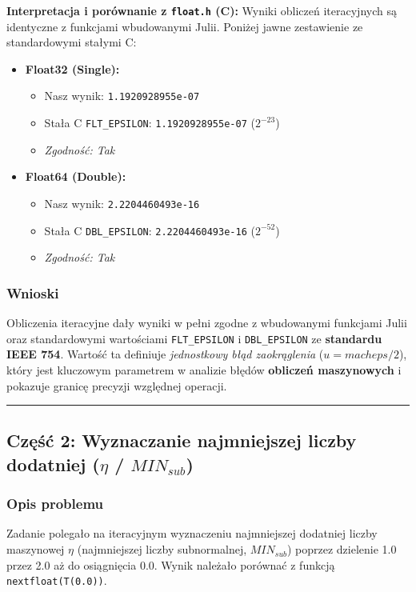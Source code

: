 \documentclass[11pt, a4paper]{article}
\newcommand{\taskseparator}{\leavevmode\leaders\hrule height 0.5pt\hfill\kern0pt}
\begin{document}
\noindent \textbf{Interpretacja i porównanie z \texttt{float.h} (C):}
Wyniki obliczeń iteracyjnych są identyczne z funkcjami wbudowanymi Julii. Poniżej jawne zestawienie ze standardowymi stałymi C:

\begin{itemize}
    \item \textbf{Float32 (Single):}
    \begin{itemize}
        \item Nasz wynik: \texttt{1.1920928955e-07}
        \item Stała C \texttt{FLT\_EPSILON}: \texttt{1.1920928955e-07} ($2^{-23}$)
        \item \textit{Zgodność: Tak}
    \end{itemize}

    \item \textbf{Float64 (Double):}
    \begin{itemize}
        \item Nasz wynik: \texttt{2.2204460493e-16}
        \item Stała C \texttt{DBL\_EPSILON}: \texttt{2.2204460493e-16} ($2^{-52}$)
        \item \textit{Zgodność: Tak}
    \end{itemize}
\end{itemize}

\subsubsection{Wnioski}
Obliczenia iteracyjne dały wyniki w pełni zgodne z wbudowanymi funkcjami Julii oraz standardowymi wartościami \texttt{FLT\_EPSILON} i \texttt{DBL\_EPSILON} ze \textbf{standardu IEEE 754}. Wartość ta definiuje \textit{jednostkowy błąd zaokrąglenia} ($u = macheps / 2$), który jest kluczowym parametrem w analizie błędów \textbf{obliczeń maszynowych} i pokazuje granicę precyzji względnej operacji.

\taskseparator

\subsection{Część 2: Wyznaczanie najmniejszej liczby dodatniej (\texorpdfstring{$\eta$ / $MIN_{sub}$}{eta / MIN\_sub})}

\subsubsection{Opis problemu}
Zadanie polegało na iteracyjnym wyznaczeniu najmniejszej dodatniej liczby maszynowej $\eta$ (najmniejszej liczby subnormalnej, $MIN_{sub}$) poprzez dzielenie 1.0 przez 2.0 aż do osiągnięcia 0.0. Wynik należało porównać z funkcją \texttt{nextfloat(T(0.0))}.
\end{document}
